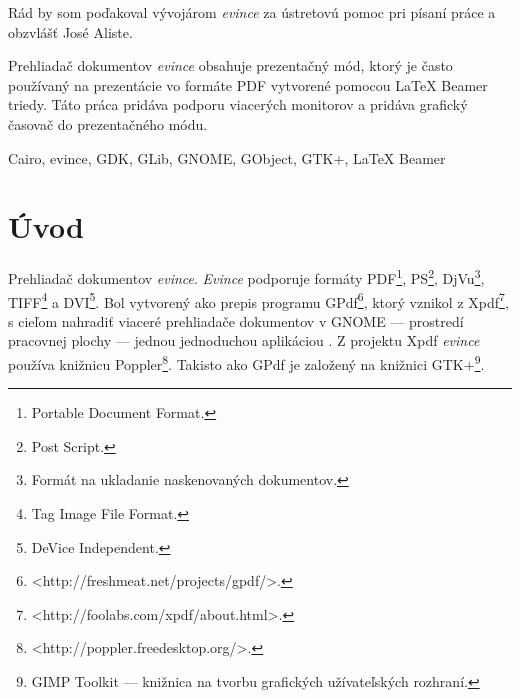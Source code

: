 \documentclass[12pt,oneside,final]{fithesis2}
\begin{document}
\FrontMatter
\ThesisTitlePage

\begin{ThesisDeclaration}
\DeclarationText
\AdvisorName
\end{ThesisDeclaration}

\begin{ThesisThanks}
Rád by som poďakoval vývojárom \emph{evince} za ústretovú pomoc pri písaní práce a obzvlášť José Aliste.
\end{ThesisThanks}  

\begin{ThesisAbstract}
Prehliadač dokumentov \emph{evince} obsahuje prezentačný mód, ktorý je často používaný na prezentácie vo formáte PDF vytvorené pomocou LaTeX Beamer triedy. Táto práca pridáva podporu viacerých monitorov a pridáva grafický časovač do prezentačného módu.
\end{ThesisAbstract}

\begin{ThesisKeyWords}
Cairo, evince, GDK, GLib, GNOME, GObject, GTK+, LaTeX Beamer
\end{ThesisKeyWords}
 
\MainMatter
\setcounter{tocdepth}{3}
\tableofcontents 
 
\chapter{Úvod}
Prehliadač dokumentov \emph{evince}. \emph{Evince} podporuje formáty PDF\footnote{Portable Document Format.}, PS\footnote{Post Script.}, DjVu\footnote{Formát na ukladanie naskenovaných dokumentov.}, TIFF\footnote{Tag Image File Format.} a DVI\footnote{DeVice Independent.}. Bol vytvorený ako prepis programu GPdf\footnote{<http://freshmeat.net/projects/gpdf/>.}, ktorý vznikol z Xpdf\footnote{<http://foolabs.com/xpdf/about.html>.}, s cieľom nahradiť viaceré prehliadače dokumentov v GNOME --- prostredí pracovnej plochy --- jednou jednoduchou aplikáciou \cite{evince}. Z projektu Xpdf \emph{evince} používa knižnicu Poppler\footnote{<http://poppler.freedesktop.org/>.}. Takisto ako GPdf je založený na knižnici GTK+\footnote{GIMP Toolkit --- knižnica na tvorbu grafických užívateľských rozhraní.}.
\end{document}

